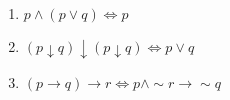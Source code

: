 \documentclass[12pt]{article}
\begin{document}
\begin{enumerate}
\begin{enumerate}








\item $p \wedge (p \vee q) \Leftrightarrow p $

\item $(p \downarrow q) \downarrow  (p \downarrow q) \Leftrightarrow p \vee q $


\item $(p \rightarrow q) \rightarrow r \Leftrightarrow p \wedge \sim r \rightarrow \sim q$ %


\end{enumerate}






\end{enumerate}
\newpage
\end{document}
